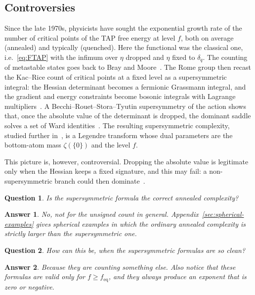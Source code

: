 \documentclass[a4paper,10pt,reqno]{amsart}
\numberwithin{equation}{section}
\newtheorem*{question}{Question}%
\newtheorem*{answer}{Answer}%
\newcommand{\eq}{\mathrm{eq}}
\begin{document}
	\subsection{Controversies}\label{sub:controversies}
	
	Since the late 1970s, physicists have sought the exponential growth rate of the
	number of critical points of the TAP free energy at level $f$, both on average
	(annealed) and typically (quenched). Here the functional was the classical one,
	i.e.\ \eqref{eq:FTAP} with the infimum over $\eta$ dropped and $\eta$ fixed to
	$\delta_q$. The counting of metastable states goes back to Bray and
	Moore~\cite{AJBray}. The Rome group then recast the Kac--Rice count of critical
	points at a fixed level as a supersymmetric integral: the Hessian determinant
	becomes a fermionic Grassmann integral, and the gradient and energy constraints
	become bosonic integrals with Lagrange
	multipliers~\cite{cavagnaformal,parisi2004supersymmetry,crisanti2003complexity}.
	A Becchi--Rouet--Stora--Tyutin supersymmetry of the action shows that, once the
	absolute value of the determinant is dropped, the dominant saddle solves a set of
	Ward identities~\cite{annibalerole}. The resulting supersymmetric complexity,
	studied further in~\cite{TAPIsing}, is a Legendre transform whose dual parameters
	are the bottom-atom mass $\zeta(\{0\})$ and the level $f$.
	
	This picture is, however, controversial. Dropping the absolute value is
	legitimate only when the Hessian keeps a fixed signature, and this may fail: a
	non-supersymmetric branch could then dominate~\cite{parisi2004supersymmetry}.
	
	\begin{question}
		Is the supersymmetric formula the correct annealed complexity?
	\end{question}
	
	\begin{answer}
		No, not for the unsigned count in general.
		Appendix~\ref{sec:spherical-examples} gives spherical examples in which the
		ordinary annealed complexity is strictly larger than the supersymmetric one.
	\end{answer}
	
	\begin{question}
		How can this be, when the supersymmetric formulas are so clean?
	\end{question}
	
	\begin{answer}
		Because they are counting something else. Also notice that these formulas are valid only for
		$f\ge f_{\eq}$, and they always produce an exponent that is zero or negative.
	\end{answer}
	
\end{document}
